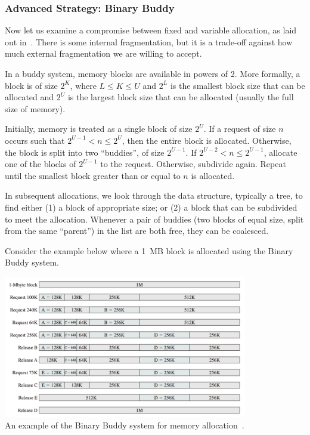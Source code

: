 \subsubsection*{Advanced Strategy: Binary Buddy}
Now let us examine a compromise between fixed and variable allocation, as laid out in~\cite{osi}. There is some internal fragmentation, but it is a trade-off against how much external fragmentation we are willing to accept.

In a buddy system, memory blocks are available in powers of 2. More formally, a block is of size $2^{K}$, where $L \leq K \leq U$ and $2^{L}$ is the smallest block size that can be allocated and $2^{U}$ is the largest block size that can be allocated (usually the full size of memory). 

Initially, memory is treated as a single block of size $2^{U}$. If a request of size $n$ occurs such that $2^{U-1} < n \leq 2^{U}$, then the entire block is allocated. Otherwise, the block is split into two ``buddies'', of size $2^{U-1}$. If $2^{U-2} < n \leq 2^{U-1}$, allocate one of the blocks of $2^{U-1}$ to the request. Otherwise, subdivide again. Repeat until the smallest block greater than or equal to $n$ is allocated. 

In subsequent allocations, we look through the data structure, typically a tree, to find either (1) a block of appropriate size; or (2) a block that can be subdivided to meet the allocation. Whenever a pair of buddies (two blocks of equal size, split from the same ``parent'') in the list are both free, they can be coalesced.

Consider the example below where a 1~MB block is allocated using the Binary Buddy system.

\begin{center}
\includegraphics[width=0.80\textwidth]{images/binary-buddy.png}\\
An example of the Binary Buddy system for memory allocation~\cite{osi}.
\end{center}




